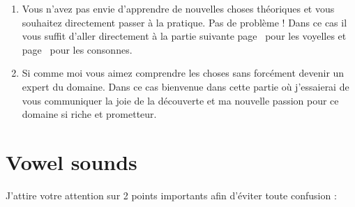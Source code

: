 \documentclass[12pt,a4paper, xetex, hyperref]{book}
\begin{document}
    \begin{enumerate}
    \item Vous n'avez pas envie d'apprendre de nouvelles choses théoriques
      et vous souhaitez directement passer à la pratique. Pas de problème
      ! Dans ce cas il vous suffit d'aller directement à la partie
      suivante page~\pageref{part:vow} pour les voyelles et
      page~\pageref{part:conson} pour les consonnes.
    \item Si comme moi vous aimez comprendre les choses sans forcément
      devenir un expert du domaine. Dans ce cas bienvenue dans cette
      partie où j'essaierai de vous communiquer la joie de la découverte
      et ma nouvelle passion pour ce domaine si riche et prometteur.  
    \end{enumerate}

    \begin{savequote}[80mm]
    \end{savequote}

    

    \begin{savequote}[80mm]
    \end{savequote}

    

    
\part{Vowel sounds}\label{part:vow}

    
    J'attire votre attention sur 2 points importants afin d'éviter toute
    confusion :
\end{document}
